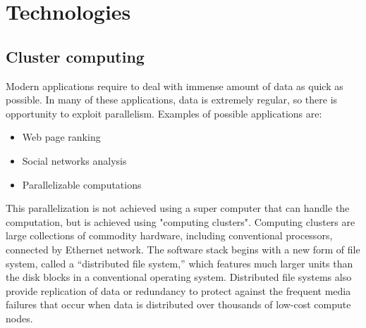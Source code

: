 \documentclass[\main/main.tex]{subfiles}
\begin{document}
\chapter{Technologies}
\section{Cluster computing}
Modern applications require to deal with immense amount of data as quick as possible. In many of these applications, data is extremely regular, so there is opportunity to exploit parallelism. Examples of possible applications are:
\begin{itemize}
    \item Web page ranking
    \item Social networks analysis
    \item Parallelizable computations
\end{itemize}
This parallelization is not achieved using a super computer that can handle the computation, but is achieved using "computing clusters". Computing clusters are large collections of commodity hardware, including conventional processors, connected by Ethernet network. The software stack begins with a new form of file system, called a “distributed file system,” which features much larger units than the disk blocks in a conventional operating system. Distributed file systems also provide replication of data or redundancy to protect against the frequent media failures that occur when data is distributed over thousands of low-cost compute nodes. \cite{leskovec_rajaraman_ullman_2020}
\end{document}
